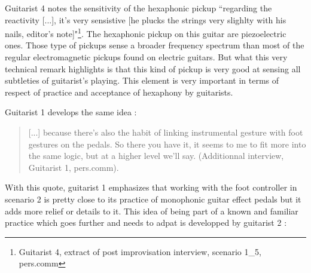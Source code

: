 \documentclass{article}
\begin{document}
Guitarist 4 notes the sensitivity of the hexaphonic pickup ``regarding the reactivity [...], it's very sensistive [he plucks the strings very slighlty with his nails, editor's note]"\footnote{Guitarist 4, extract of post improvisation interview,  scenario 1\_5, pers.comm}. The hexaphonic pickup on this guitar are piezoelectric ones. Those type of pickups sense a broader frequency spectrum \cite{sci:Lemme_SoundSecret_electricGuitar} than most of the regular electromagnetic pickups found on electric guitars. 
But what this very technical remark highlights is that this kind of pickup is very good at sensing all subtleties of guitarist's playing. This element is very important in terms of respect of practice and acceptance of hexaphony by guitarists. 


Guitarist 1 develops the same idea :


\begin{quote}
[...] because there's also the habit of linking instrumental gesture with foot gestures on the pedals. So there you have it, it seems to me to fit more into the same logic, but at a higher level we'll say. (Additionnal interview, Guitarist 1, pers.comm).
\end{quote}

With this quote, guitarist 1 emphasizes that working with the foot controller in scenario 2 is pretty close to its practice of monophonic guitar effect pedals but it adds more relief or details to it. This idea of being part of a known and familiar practice which goes further and needs to adpat is developped by guitarist 2 : 
\end{document}
